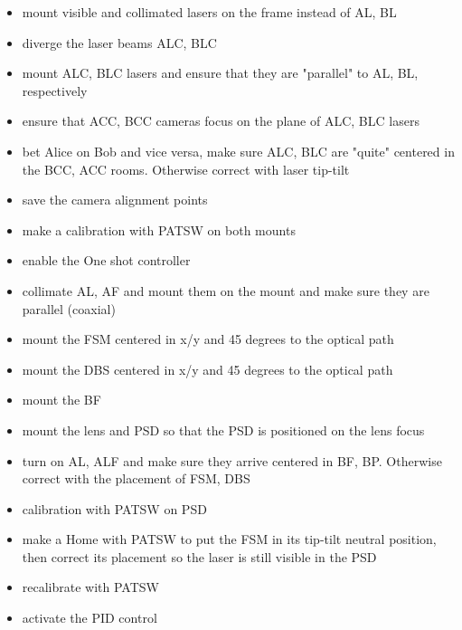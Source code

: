 \begin{itemize}
  \item mount visible and collimated lasers on the frame instead of AL, BL
  \item diverge the laser beams ALC, BLC
  \item mount ALC, BLC lasers and ensure that they are "parallel" to AL, BL, respectively
  \item ensure that ACC, BCC cameras focus on the plane of ALC, BLC lasers
  \item bet Alice on Bob and vice versa, make sure ALC, BLC are "quite" centered in the BCC, ACC rooms. Otherwise correct with laser tip-tilt
  \item save the camera alignment points
  \item make a calibration with PATSW on both mounts
  \item enable the One shot controller
\end{itemize}

\begin{itemize}
  \item collimate AL, AF and mount them on the mount and make sure they are parallel (coaxial)
  \item mount the FSM centered in x/y and 45 degrees to the optical path
  \item mount the DBS centered in x/y and 45 degrees to the optical path
  \item mount the BF
  \item mount the lens and PSD so that the PSD is positioned on the lens focus
  \item turn on AL, ALF and make sure they arrive centered in BF, BP. Otherwise correct with the placement of FSM, DBS
  \item calibration with PATSW on PSD
  \item make a Home with PATSW to put the FSM in its tip-tilt neutral position, then correct its placement so the laser is still visible in the PSD
  \item recalibrate with PATSW
  \item activate the PID control
\end{itemize}

